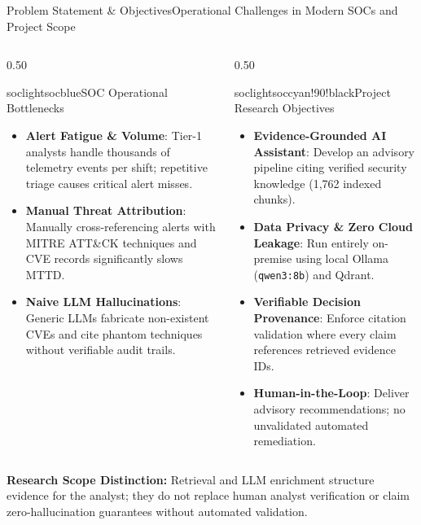 \documentclass[aspectratio=169, 10pt]{beamer}
\begin{document}
\begin{frame}{Problem Statement \& Objectives}{Operational Challenges in Modern SOCs and Project Scope}
  \begin{columns}[T]
    \begin{column}{0.50\textwidth}
      \begin{cardbox}{soclight}{socblue}{SOC Operational Bottlenecks}
        \begin{itemize}\setlength{\itemsep}{2pt}
          \item \textbf{Alert Fatigue \& Volume}: Tier-1 analysts handle thousands of telemetry events per shift; repetitive triage causes critical alert misses.
          \item \textbf{Manual Threat Attribution}: Manually cross-referencing alerts with MITRE ATT\&CK techniques and CVE records significantly slows MTTD.
          \item \textbf{Naive LLM Hallucinations}: Generic LLMs fabricate non-existent CVEs and cite phantom techniques without verifiable audit trails.
        \end{itemize}
      \end{cardbox}
    \end{column}

    \begin{column}{0.50\textwidth}
      \begin{cardbox}{soclight}{soccyan!90!black}{Project Research Objectives}
        \begin{itemize}\setlength{\itemsep}{2pt}
          \item \textbf{Evidence-Grounded AI Assistant}: Develop an advisory pipeline citing verified security knowledge (1,762 indexed chunks).
          \item \textbf{Data Privacy \& Zero Cloud Leakage}: Run entirely on-premise using local Ollama (\texttt{qwen3:8b}) and Qdrant.
          \item \textbf{Verifiable Decision Provenance}: Enforce citation validation where every claim references retrieved evidence IDs.
          \item \textbf{Human-in-the-Loop}: Deliver advisory recommendations; no unvalidated automated remediation.
        \end{itemize}
      \end{cardbox}
    \end{column}
  \end{columns}

  \vspace{0.15cm}
  \begin{tcolorbox}[colback=socnavy!5,colframe=socblue,boxrule=0.5pt,arc=1mm,top=3pt,bottom=3pt,left=6pt,right=6pt]
    \scriptsize\textbf{Research Scope Distinction:} Retrieval and LLM enrichment structure evidence for the analyst; they do not replace human analyst verification or claim zero-hallucination guarantees without automated validation.
  \end{tcolorbox}
\end{frame}
\end{document}
